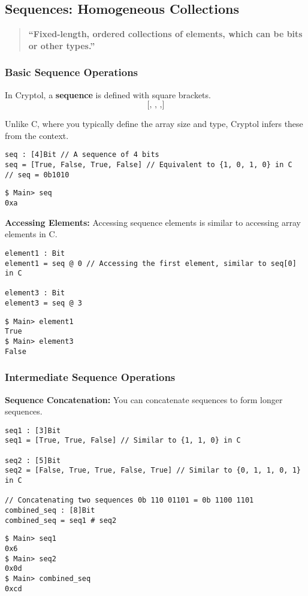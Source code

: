 \newpage
\subsection{Sequences: Homogeneous Collections}
\begin{quote}\bf
``Fixed-length, ordered collections of elements, which can be bits or other types.''
\end{quote}

\subsubsection{Basic Sequence Operations}
\begin{tcolorbox}[colframe=defcolor,title={\color{white}\bf Sequence}]
In Cryptol, a \textbf{sequence} is defined with square brackets. \[
\texttt{[, , ,]}
\]
\end{tcolorbox}
\begin{remark}
Unlike C, where you typically define the array size and type, Cryptol infers these from the context.
\end{remark}
\begin{lstlisting}[style=cryptol]
seq : [4]Bit // A sequence of 4 bits
seq = [True, False, True, False] // Equivalent to {1, 0, 1, 0} in C
// seq = 0b1010
\end{lstlisting}
\begin{lstlisting}[style=zsh]
$ Main> seq
0xa
\end{lstlisting}
\vspace{16pt}
\textbf{Accessing Elements:} Accessing sequence elements is similar to accessing array elements in C.
\begin{lstlisting}[style=cryptol]
element1 : Bit
element1 = seq @ 0 // Accessing the first element, similar to seq[0] in C

element3 : Bit
element3 = seq @ 3
\end{lstlisting}
\begin{lstlisting}[style=zsh]
$ Main> element1
True
$ Main> element3
False
\end{lstlisting}

\subsubsection{Intermediate Sequence Operations}
\textbf{Sequence Concatenation:} You can concatenate sequences to form longer sequences.
\begin{lstlisting}[style=cryptol]
seq1 : [3]Bit
seq1 = [True, True, False] // Similar to {1, 1, 0} in C

seq2 : [5]Bit
seq2 = [False, True, True, False, True] // Similar to {0, 1, 1, 0, 1} in C

// Concatenating two sequences 0b 110 01101 = 0b 1100 1101
combined_seq : [8]Bit
combined_seq = seq1 # seq2
\end{lstlisting}
\begin{lstlisting}[style=zsh]
$ Main> seq1
0x6
$ Main> seq2
0x0d
$ Main> combined_seq
0xcd
\end{lstlisting}

